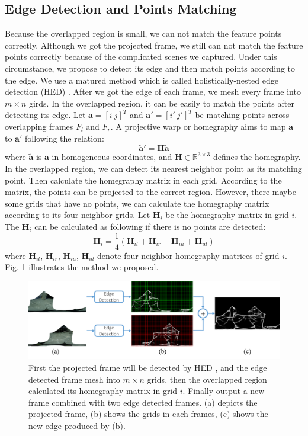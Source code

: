 \documentclass[conference]{IEEEtran}
\begin{document}
\subsection{Edge Detection and Points Matching}
\label{ssec:edge-detection}
Because the overlapped region is small, we can not match the feature points correctly. Although we got the projected frame, we still can not 
match the feature points correctly because of the complicated scenes we captured. Under this circumstance, we propose to detect its edge and then match points according to the edge.
We use a matured method which is called holistically-nested edge detection (HED) \cite{xie2015holistically}. After we got the edge of each frame, we mesh every frame into $m \times n$
girds. In the overlapped region, it can be easily to match the points after detecting its edge. Let $\textbf{a} = [i \ j]^T$ and $\textbf{a}' = [i' \ j']^T$ be matching points
across overlapping frames $F_l$ and $F_r$. A projective warp or homegraphy aims to map $\textbf{a}$ to $\textbf{a}'$ following the relation:
\begin{equation}
\widetilde{\textbf{a}}'=\textbf{H}\widetilde{\textbf{a}}
\end{equation}
where $\widetilde{\textbf{a}}$ is $\textbf{a}$ in homogeneous coordinates, and $\textbf{H}\in\mathbb{R}^{3 \times 3}$ defines the homegraphy. In the overlapped region,
we can detect its nearest neighbor point as its matching point. Then calculate the homegraphy matrix in each grid. According to the matrix, the points can be projected to the correct region.
However, there maybe some grids that have no points, we can calculate the homegraphy matrix according to its four neighbor grids. Let $\textbf{H}_i$ be the homegraphy matrix in grid $i$.
The $\textbf{H}_{i}$ can be calculated as following if there is no points are detected:
\begin{equation}
\textbf{H}_{i} = \frac{1}{4}\left(\textbf{H}_{il}+\textbf{H}_{ir}+\textbf{H}_{iu}+\textbf{H}_{id}\right)
\end{equation} 
where $\textbf{H}_{il}$, 
$\textbf{H}_{ir}$, 
$\textbf{H}_{iu}$, 
$\textbf{H}_{id}$ 
denote four neighbor homegraphy matrices of grid 
$i$.
Fig. \ref{fig:p8} illustrates the method we proposed.
\begin{figure}[!htpb]
\centering
\includegraphics[scale=0.22]{picture41.png}
\caption{First the projected frame will be detected by HED \cite{xie2015holistically}, and the edge detected frame mesh into $m \times n$ grids, then the overlapped region calculated its homegraphy matrix in grid $i$.
Finally output a new frame combined with two edge detected frames. (a) depicts the projected frame, (b) shows the grids in each frames, (c) shows the new edge produced by (b).}
\label{fig:p8}
\end{figure}
\end{document}
